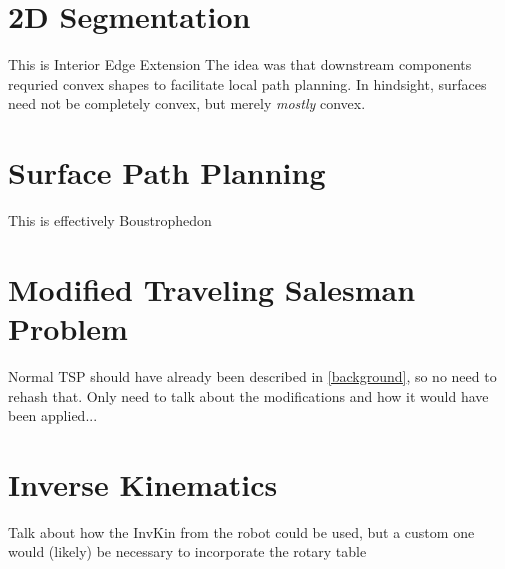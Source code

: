 \section{2D Segmentation}
This is Interior Edge Extension
The idea was that downstream components requried convex shapes to facilitate local path planning.
In hindsight, surfaces need not be completely convex, but merely \textit{mostly} convex.

\section{Surface Path Planning}
This is effectively Boustrophedon

\section{Modified Traveling Salesman Problem}
Normal TSP should have already been described in \ref{background}, so no need to rehash that.
Only need to talk about the modifications and how it would have been applied...

\section{Inverse Kinematics}
Talk about how the InvKin from the robot could be used, but a custom one would (likely) be necessary to incorporate the rotary table

